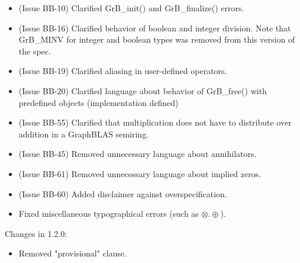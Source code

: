 \begin{itemize}
\item (Issue BB-10) Clarified {\sf GrB\_init()} and {\sf GrB\_finalize()} errors.
\item (Issue BB-16) Clarified behavior of boolean and integer division. {\color{red} Note that {\sf GrB\_MINV} for integer and boolean types was removed from this version of the spec.}
\item (Issue BB-19) Clarified aliasing in user-defined operators.
\item (Issue BB-20) Clarified language about behavior of {\sf GrB\_free()} with predefined objects (implementation defined)
\item (Issue BB-55) Clarified that multiplication does not have to distribute over addition in a GraphBLAS semiring.
\item (Issue BB-45) Removed unnecessary language about annihilators.
\item (Issue BB-61) Removed unnecessary language about implied zeros.
\item (Issue BB-60) Added disclaimer against overspecification.
\item Fixed miscellaneous typographical errors (such as $\otimes.\oplus$).
\end{itemize}


Changes in 1.2.0:
\begin{itemize}
\item Removed "provisional" clause.
\end{itemize}



